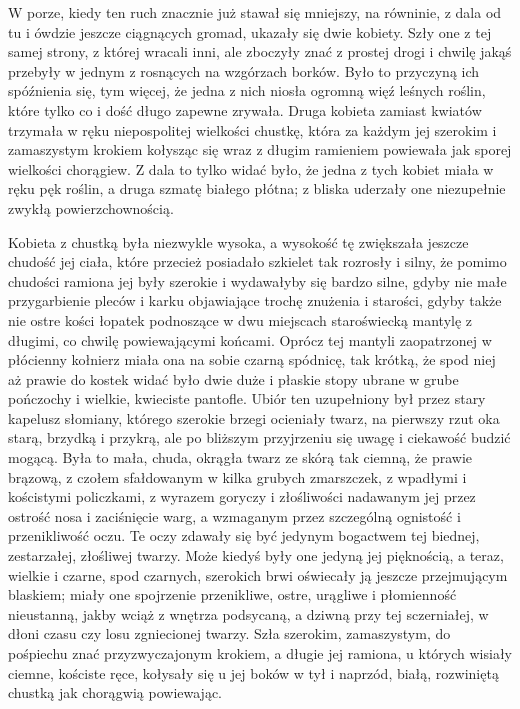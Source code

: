 \documentclass{article}
\begin{document}
W porze, kiedy ten ruch znacznie już stawał się mniejszy, na równinie, z dala od tu i ówdzie jeszcze ciągnących gromad, ukazały się dwie kobiety. Szły one z tej samej strony, z której wracali inni, ale zboczyły znać z prostej drogi i chwilę jakąś przebyły w jednym z rosnących na wzgórzach borków. Było to przyczyną ich spóźnienia się, tym więcej, że jedna z nich niosła ogromną więź leśnych roślin, które tylko co i dość długo zapewne zrywała. Druga kobieta zamiast kwiatów trzymała w ręku niepospolitej wielkości chustkę, która za każdym jej szerokim i zamaszystym krokiem kołysząc się wraz z długim ramieniem powiewała jak sporej wielkości chorągiew. Z dala to tylko widać było, że jedna z tych kobiet miała w ręku pęk roślin, a druga szmatę białego płótna; z bliska uderzały one niezupełnie zwykłą powierzchownością.

Kobieta z chustką była niezwykle wysoka, a wysokość tę zwiększała jeszcze chudość jej ciała, które przecież posiadało szkielet tak rozrosły i silny, że pomimo chudości ramiona jej były szerokie i wydawałyby się bardzo silne, gdyby nie małe przygarbienie pleców i karku objawiające trochę znużenia i starości, gdyby także nie ostre kości łopatek podnoszące w dwu miejscach staroświecką mantylę z długimi, co chwilę powiewającymi końcami. Oprócz tej mantyli zaopatrzonej w płócienny kołnierz miała ona na sobie czarną spódnicę, tak krótką, że spod niej aż prawie do kostek widać było dwie duże i płaskie stopy ubrane w grube pończochy i wielkie, kwieciste pantofle. Ubiór ten uzupełniony był przez stary kapelusz słomiany, którego szerokie brzegi ocieniały twarz, na pierwszy rzut oka starą, brzydką i przykrą, ale po bliższym przyjrzeniu się uwagę i ciekawość budzić mogącą. Była to mała, chuda, okrągła twarz ze skórą tak ciemną, że prawie brązową, z czołem sfałdowanym w kilka grubych zmarszczek, z wpadłymi i kościstymi policzkami, z wyrazem goryczy i złośliwości nadawanym jej przez ostrość nosa i zaciśnięcie warg, a wzmaganym przez szczególną ognistość i przenikliwość oczu. Te oczy zdawały się być jedynym bogactwem tej biednej, zestarzałej, złośliwej twarzy. Może kiedyś były one jedyną jej pięknością, a teraz, wielkie i czarne, spod czarnych, szerokich brwi oświecały ją jeszcze przejmującym blaskiem; miały one spojrzenie przenikliwe, ostre, urągliwe i płomienność nieustanną, jakby wciąż z wnętrza podsycaną, a dziwną przy tej sczerniałej, w dłoni czasu czy losu zgniecionej twarzy. Szła szerokim, zamaszystym, do pośpiechu znać przyzwyczajonym krokiem, a długie jej ramiona, u których wisiały ciemne, kościste ręce, kołysały się u jej boków w tył i naprzód, białą, rozwiniętą chustką jak chorągwią powiewając.
\end{document}
